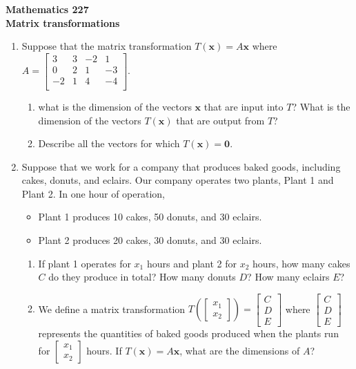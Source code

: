 \documentclass[12pt]{article}
\newcommand{\vs}[1]{\vspace{#1in}}
\newcommand{\xvec}{{\mathbf x}}
\newcommand{\zerovec}{{\mathbf 0}}
\newcommand{\twovec}[2]{\left[\begin{array}{r}#1 \\ #2
    \end{array}\right]}
\newcommand{\threevec}[3]{\left[\begin{array}{r}#1 \\ #2 \\ #3
  \end{array}\right]}
\begin{document}
\noindent
{\bf Mathematics 227} \\ 
{\bf Matrix transformations}

\bigskip
\begin{enumerate}
\item Suppose that the matrix transformation $T(\xvec) = A\xvec$ where 
  $
  A =
  \left[
    \begin{array}{cccc}
      3 & 3 & -2 & 1 \\
      0 & 2 & 1 & -3 \\
      -2 & 1 & 4 & -4 \\
    \end{array}
  \right].
  $

  \begin{enumerate}[label=(\alph*)]
  \item what is the dimension of the vectors $\xvec$ that are input
    into $T$?  What is the dimension of the vectors $T(\xvec)$ that
    are output from $T$?
    
    \vs{1}
  \item Describe all the vectors for which $T(\xvec) = \zerovec$.
    
    \vs{1}
  \end{enumerate}

\item Suppose that we work for a company that produces baked goods,
  including cakes, donuts, and eclairs. Our company operates two
  plants, Plant 1 and Plant 2. In one hour of operation,
  \begin{itemize}
  \item Plant 1 produces 10 cakes, 50 donuts, and 30 eclairs.
  \item Plant 2 produces 20 cakes, 30 donuts, and 30 eclairs.
  \end{itemize}
  
  \begin{enumerate}[label=(\alph*)]
    \item If plant 1 operates for $x_1$ hours and plant 2 for $x_2$
      hours, how many cakes $C$ do they produce in total?  How many
      donuts $D$?  How many eclairs $E$?

      \vs{1}
    \item We define a matrix transformation
      $
      T\left(\twovec{x_1}{x_2}\right) = \threevec CDE
      $
      where $\threevec CDE$ represents the quantities of baked goods
      produced when the plants run for $\twovec{x_1}{x_2}$ hours.  If
      $T(\xvec) = A\xvec$, what are the dimensions of $A$?


\end{enumerate}
\end{enumerate}
\end{document}
